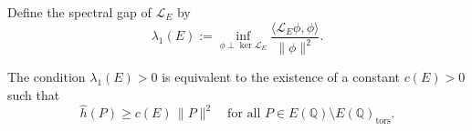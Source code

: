 \begin{definition}
Define the spectral gap of $\mathcal L_E$ by
\[
\lambda_1(E) :=
\inf_{\phi \perp \ker \mathcal L_E}
\frac{\langle \mathcal L_E \phi, \phi \rangle}{\|\phi\|^2}.
\]
\end{definition}

\begin{lemma}
The condition $\lambda_1(E) > 0$ is equivalent to the existence of a constant
$c(E)>0$ such that
\[
\hat h(P) \ge c(E)\,\|P\|^2
\quad \text{for all } P \in E(\mathbb{Q}) \setminus E(\mathbb{Q})_{\mathrm{tors}}.
\]
\end{lemma}

